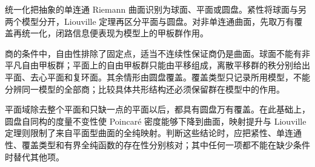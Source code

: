 




\begin{chaptersummary}
统一化把抽象的单连通 Riemann 曲面识别为球面、平面或圆盘。紧性将球面与另两个模型分开，Liouville 定理再区分平面与圆盘。对非单连通曲面，先取万有覆盖再统一化，闭路信息便表现为模型上的甲板群作用。

\ProseParagraphBreak
商的条件中，自由性排除了固定点，适当不连续性保证商仍是曲面。球面不能有非平凡自由甲板群；平面上的自由甲板群只能由平移组成，离散平移群的秩分别给出平面、去心平面和复环面。其余情形由圆盘覆盖。覆盖类型只记录所用模型，不能分辨同一模型的全部商；比较具体共形结构还必须保留群在模型中的作用。

\ProseParagraphBreak
平面域除去整个平面和只缺一点的平面以后，都具有圆盘万有覆盖。在此基础上，圆盘自同构的度量不变性使 Poincaré 密度能够下降到曲面，映射提升与 Liouville 定理则限制了来自平面型曲面的全纯映射。判断这些结论时，应把紧性、单连通性、覆盖类型和有界全纯函数的存在性分别核对；其中任何一项都不能在缺少条件时替代其他项。
\end{chaptersummary}

\BookExercises

